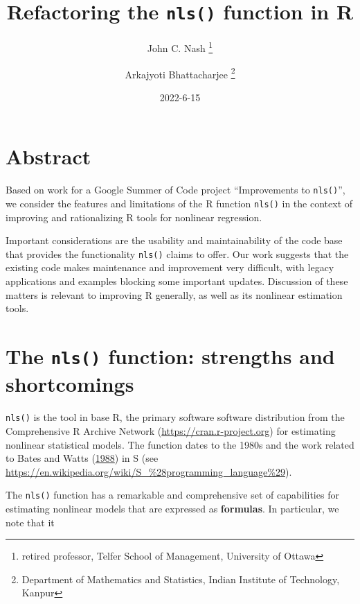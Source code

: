 \documentclass[
]{article}
\title{Refactoring the \texttt{nls()} function in R}
\author{John C. Nash
\thanks{ retired professor, Telfer School of Management, University of Ottawa} \and Arkajyoti
Bhattacharjee
\thanks{Department of Mathematics and Statistics, Indian Institute of Technology, Kanpur}}
\date{2022-6-15}
\begin{document}
\maketitle

{
\hypersetup{linkcolor=}
\setcounter{tocdepth}{2}
\tableofcontents
}
\hypertarget{abstract}{%
\section{Abstract}\label{abstract}}

Based on work for a Google Summer of Code project ``Improvements to
\texttt{nls()}'', we consider the features and limitations of the R
function \texttt{nls()} in the context of improving and rationalizing R
tools for nonlinear regression.

Important considerations are the usability and maintainability of the
code base that provides the functionality \texttt{nls()} claims to
offer. Our work suggests that the existing code makes maintenance and
improvement very difficult, with legacy applications and examples
blocking some important updates. Discussion of these matters is relevant
to improving R generally, as well as its nonlinear estimation tools.

\hypertarget{the-nls-function-strengths-and-shortcomings}{%
\section{\texorpdfstring{The \texttt{nls()} function: strengths and
shortcomings}{The nls() function: strengths and shortcomings}}\label{the-nls-function-strengths-and-shortcomings}}

\texttt{nls()} is the tool in base R, the primary software software
distribution from the Comprehensive R Archive Network
(\url{https://cran.r-project.org}) for estimating nonlinear statistical
models. The function dates to the 1980s and the work related to Bates
and Watts (\protect\hyperlink{ref-bateswatts}{1988}) in S (see
\url{https://en.wikipedia.org/wiki/S_\%28programming_language\%29}).

The \texttt{nls()} function has a remarkable and comprehensive set of
capabilities for estimating nonlinear models that are expressed as
\textbf{formulas}. In particular, we note that it
\end{document}
